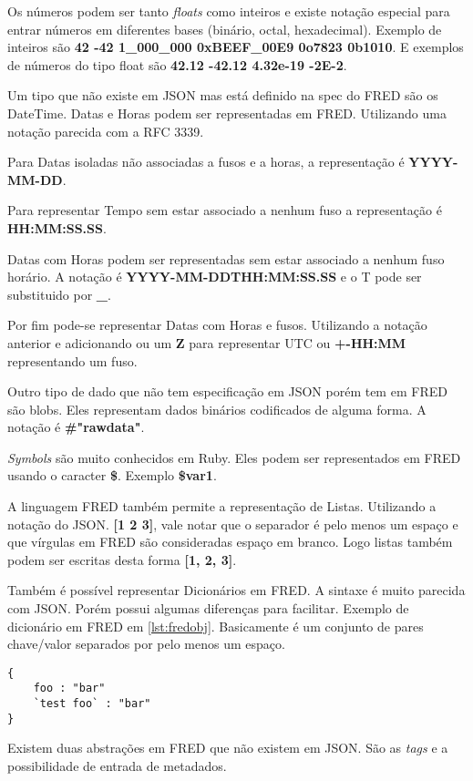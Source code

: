 Os números podem ser tanto \textit{floats} como inteiros e existe notação especial para
entrar números em diferentes bases (binário, octal, hexadecimal). Exemplo de inteiros 
são \textbf{42 -42 1\_000\_000 0xBEEF\_00E9 0o7823 0b1010}. E exemplos de números do tipo
float são \textbf{42.12 -42.12 4.32e-19 -2E-2}.

Um tipo que não existe em JSON mas está definido na spec do FRED são os DateTime.
Datas e Horas podem ser representadas em FRED. Utilizando uma notação parecida com
a RFC 3339.

Para Datas isoladas não associadas a fusos e a horas, a representação é \textbf{YYYY-MM-DD}.

Para representar Tempo sem estar associado a nenhum fuso a representação é \textbf{HH:MM:SS.SS}.

Datas com Horas podem ser representadas sem estar associado a nenhum fuso horário. 
A notação é \textbf{YYYY-MM-DDTHH:MM:SS.SS} e o T pode ser substituido por \textbf{\_}.

Por fim pode-se representar Datas com Horas e fusos. Utilizando a notação anterior e adicionando
ou um \textbf{Z} para representar UTC ou \textbf{+-HH:MM} representando um fuso.

Outro tipo de dado que não tem especificação em JSON porém tem em FRED são blobs. Eles
representam dados binários codificados de alguma forma. A notação é \textbf{\#"rawdata"}.

\textit{Symbols} são muito conhecidos em Ruby. Eles podem ser representados em FRED usando o caracter
\textbf{\$}. Exemplo \textbf{\$var1}.

A linguagem FRED também permite a representação de Listas. Utilizando a notação do JSON.
\textbf{[1 2 3]}, vale notar que o separador é pelo menos um espaço e que vírgulas em FRED
são consideradas espaço em branco. Logo listas também podem ser escritas desta forma \textbf{[1, 2, 3]}.

Também é possível representar Dicionários em FRED. A sintaxe é muito parecida com JSON. Porém
possui algumas diferenças para facilitar. Exemplo de dicionário em FRED em \ref{lst:fredobj}.
Basicamente é um conjunto de pares chave/valor separados por pelo menos um espaço.

\begin{lstlisting}[caption=Exemplo de dicionário em FRED,label={lst:fredobj}]
{
    foo : "bar"
    `test foo` : "bar"
}
\end{lstlisting}

Existem duas abstrações em FRED que não existem em JSON. São as \textit{tags} e a possibilidade de entrada 
de metadados.

